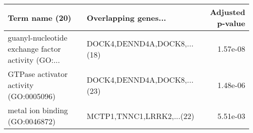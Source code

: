 \begin{tabular}{llr}
\toprule
                                    Term name (20) &        Overlapping genes... &  Adjusted p-value \\
\midrule
guanyl-nucleotide exchange factor activity (GO:... & DOCK4,DENND4A,DOCK8,...(18) &          1.57e-08 \\
            GTPase activator activity (GO:0005096) & DOCK4,DENND4A,DOCK8,...(23) &          1.48e-06 \\
                    metal ion binding (GO:0046872) &   MCTP1,TNNC1,LRRK2,...(22) &          5.51e-03 \\
\bottomrule
\end{tabular}
